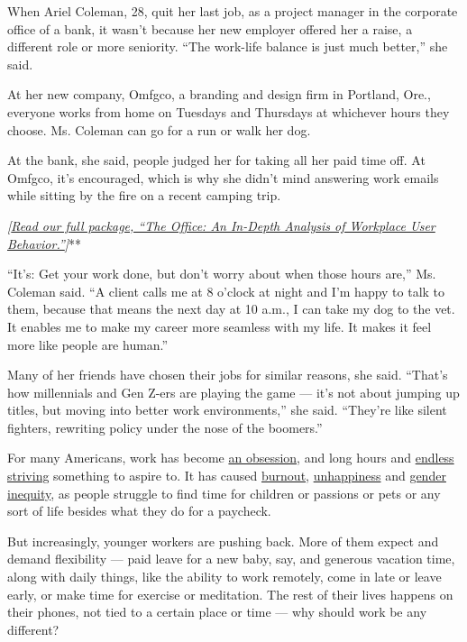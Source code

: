 When Ariel Coleman, 28, quit her last job, as a project manager in the
corporate office of a bank, it wasn't because her new employer offered
her a raise, a different role or more seniority. ``The work-life balance
is just much better,'' she said.

At her new company, Omfgco, a branding and design firm in Portland,
Ore., everyone works from home on Tuesdays and Thursdays at whichever
hours they choose. Ms. Coleman can go for a run or walk her dog.

At the bank, she said, people judged her for taking all her paid time
off. At Omfgco, it's encouraged, which is why she didn't mind answering
work emails while sitting by the fire on a recent camping trip.

\emph{\emph{\emph{{[}}\href{https://www.nytimes.com/interactive/2019/09/17/style/the-office.html}{\emph{Read
our full package, ``The Office: An In-Depth Analysis of Workplace User
Behavior.''}}}{]}}**

``It's: Get your work done, but don't worry about when those hours
are,'' Ms. Coleman said. ``A client calls me at 8 o'clock at night and
I'm happy to talk to them, because that means the next day at 10 a.m., I
can take my dog to the vet. It enables me to make my career more
seamless with my life. It makes it feel more like people are human.''

Many of her friends have chosen their jobs for similar reasons, she
said. ``That's how millennials and Gen Z-ers are playing the game ---
it's not about jumping up titles, but moving into better work
environments,'' she said. ``They're like silent fighters, rewriting
policy under the nose of the boomers.''

For many Americans, work has become
\href{https://www.nytimes.com/2019/01/26/business/against-hustle-culture-rise-and-grind-tgim.html}{an
obsession}, and long hours and
\href{https://www.theatlantic.com/ideas/archive/2019/02/religion-workism-making-americans-miserable/583441/}{endless
striving} something to aspire to. It has caused
\href{https://www.buzzfeednews.com/article/annehelenpetersen/millennials-burnout-generation-debt-work}{burnout},
\href{https://worldhappiness.report/ed/2019/}{unhappiness} and
\href{https://www.nytimes.com/2019/04/26/upshot/women-long-hours-greedy-professions.html}{gender
inequity}, as people struggle to find time for children or passions or
pets or any sort of life besides what they do for a paycheck.

But increasingly, younger workers are pushing back. More of them expect
and demand flexibility --- paid leave for a new baby, say, and generous
vacation time, along with daily things, like the ability to work
remotely, come in late or leave early, or make time for exercise or
meditation. The rest of their lives happens on their phones, not tied to
a certain place or time --- why should work be any different?

